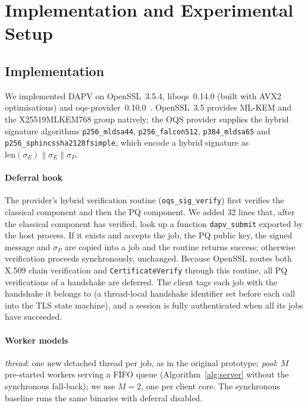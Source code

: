 \documentclass[preprint,10pt,3p]{elsarticle}
\begin{document}
\section{Implementation and Experimental Setup}
\label{sec:setup}

\subsection{Implementation}
\label{sec:impl}

\begin{sloppypar}
We implemented DAPV on OpenSSL~3.5.4, liboqs~0.14.0 (built with AVX2
optimisations) and oqs-provider~0.10.0~\cite{OQS2017}.  OpenSSL~3.5 provides
ML-KEM and the X25519MLKEM768 group natively; the OQS provider supplies the
hybrid signature algorithms \texttt{p256\_mldsa44}, \texttt{p256\_falcon512},
\texttt{p384\_mldsa65} and
\texttt{p256\_sphincssha2128\allowbreak fsimple}, which encode
a hybrid signature as $\mathrm{len}(\sigma_E)\|\sigma_E\|\sigma_P$.
\end{sloppypar}

\paragraph{Deferral hook} The provider's hybrid verification routine
(\texttt{oqs\_sig\_verify}) first verifies the classical component and then
the PQ component.  We added 32 lines that, after the classical component has
verified, look up a function \texttt{dapv\_submit} exported by the host
process.  If it exists and accepts the job, the PQ public key, the signed
message and $\sigma_P$ are copied into a job and the routine returns success;
otherwise verification proceeds synchronously, unchanged.  Because OpenSSL
routes both X.509 chain verification and \texttt{CertificateVerify} through
this routine, all PQ verifications of a handshake are deferred.  The client
tags each job with the handshake it belongs to (a thread-local handshake
identifier set before each call into the TLS state machine), and a session
is fully authenticated when all its jobs have succeeded.

\paragraph{Worker models} \emph{thread}: one new detached thread per job,
as in the original prototype; \emph{pool}: $M$ pre-started workers serving a
FIFO queue (Algorithm~\ref{alg:server} without the synchronous fall-back);
we use $M=2$, one per client core.  The synchronous baseline runs the same
binaries with deferral disabled.
\end{document}
